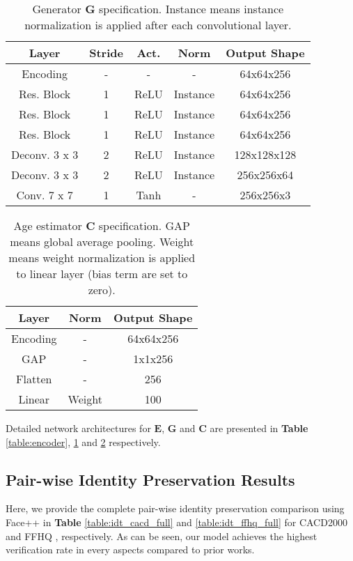 \documentclass[final]{cvpr}
\begin{document}
\begin{table}[h]
  \centering
  \begin{tabular}{ccccc}
    \toprule
    Layer & Stride & Act. & Norm & Output Shape \\
    \midrule
    Encoding & - & - & - & 64x64x256 \\
    \midrule
    Res. Block & 1 & ReLU & Instance & 64x64x256 \\
    Res. Block & 1 & ReLU & Instance & 64x64x256 \\
    Res. Block & 1 & ReLU & Instance & 64x64x256 \\
    \midrule
    Deconv. 3 x 3 & 2 & ReLU & Instance & 128x128x128 \\
    Deconv. 3 x 3 & 2 & ReLU & Instance & 256x256x64 \\
    \midrule
    Conv. 7 x 7 & 1 & Tanh & - & 256x256x3 \\
    \bottomrule
  \end{tabular}
  \caption{Generator $\mathbf{G}$ specification. Instance means instance normalization \cite{ulyanov2016instance} is applied after each convolutional layer.}
    \label{table:decoder}
\end{table}

\begin{table}[h]
  \centering
  \begin{tabular}{ccc}
    \toprule
    Layer & Norm & Output Shape \\
    \midrule
    Encoding & - & 64x64x256 \\
    \midrule
    GAP & - & 1x1x256 \\
    Flatten & - & 256 \\
    Linear & Weight & 100 \\
    \bottomrule
  \end{tabular}
  \caption{Age estimator $\mathbf{C}$ specification. GAP means global average pooling. Weight means weight normalization \cite{salimans2016weight} is applied to linear layer (bias term are set to zero).}
    \label{table:estimator}
\end{table}

Detailed network architectures for $\mathbf{E}$, $\mathbf{G}$ and $\mathbf{C}$ are presented in \textbf{Table} \ref{table:encoder}, \ref{table:decoder} and \ref{table:estimator} respectively. 

\subsection{Pair-wise Identity Preservation Results}
Here, we provide the complete pair-wise identity preservation comparison using Face++ in \textbf{Table} \ref{table:idt_cacd_full} and \ref{table:idt_ffhq_full} for CACD2000 \cite{chen2014cross} and FFHQ \cite{karras2019style}, respectively. As can be seen, our model achieves the highest verification rate in every aspects compared to prior works.
\end{document}
